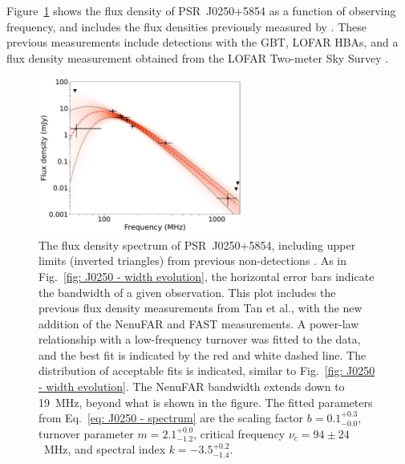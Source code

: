 Figure~\ref{fig: J0250 - spectrum} shows the flux density of PSR~J0250+5854 as a function of observing frequency, and includes the flux densities previously measured by \citet{TBC+2018}. These previous measurements include detections with the GBT, LOFAR HBAs, and a flux density measurement obtained from the LOFAR Two-meter Sky Survey \citep[LoTSS;][]{SRB+2017}.
\begin{figure}
    \begin{center}
        \includegraphics[width=0.6\textwidth]{Figures/J0250/spectral_index_turnover}
        \caption[The radio frequency flux density spectrum of PSR~J0250+5854]{The flux density spectrum of PSR~J0250+5854, including upper limits (inverted triangles) from previous non-detections \citep{TBC+2018}. As in Fig.~\ref{fig: J0250 - width evolution}, the horizontal error bars indicate the bandwidth of a given observation. This plot includes the previous flux density measurements from Tan et al., with the new addition of the NenuFAR and FAST measurements. A power-law relationship with a low-frequency turnover was fitted to the data, and the best fit is indicated by the red and white dashed line. The distribution of acceptable fits is indicated, similar to Fig.~\ref{fig: J0250 - width evolution}. The NenuFAR bandwidth extends down to 19~MHz, beyond what is shown in the figure. The fitted parameters from Eq.~\eqref{eq: J0250 - spectrum} are the scaling factor $b = 0.1^{+0.3}_{-0.0}$, turnover parameter $m = 2.1^{+0.0}_{-1.2}$, critical frequency $\nu_c = 94\pm24$~MHz, and spectral index $k = -3.5^{+0.2}_{-1.4}$.}
        \label{fig: J0250 - spectrum}
    \end{center}
\end{figure}

